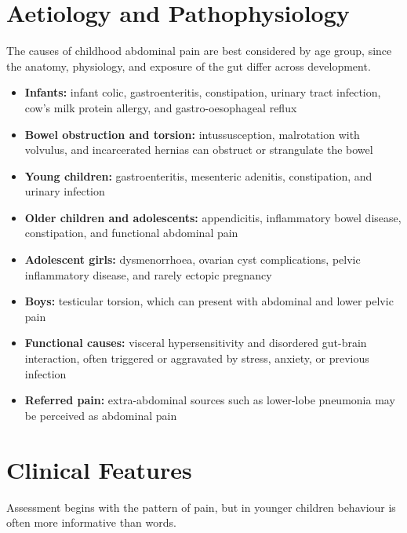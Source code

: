 \section*{Aetiology and Pathophysiology}
The causes of childhood abdominal pain are best considered by age group, since the anatomy, physiology, and exposure of the gut differ across development.

\begin{itemize}
    \item \textbf{Infants:} infant colic, gastroenteritis, constipation, urinary tract infection, cow's milk protein allergy, and gastro-oesophageal reflux
    \item \textbf{Bowel obstruction and torsion:} intussusception, malrotation with volvulus, and incarcerated hernias can obstruct or strangulate the bowel
    \item \textbf{Young children:} gastroenteritis, mesenteric adenitis, constipation, and urinary infection
    \item \textbf{Older children and adolescents:} appendicitis, inflammatory bowel disease, constipation, and functional abdominal pain
    \item \textbf{Adolescent girls:} dysmenorrhoea, ovarian cyst complications, pelvic inflammatory disease, and rarely ectopic pregnancy
    \item \textbf{Boys:} testicular torsion, which can present with abdominal and lower pelvic pain
    \item \textbf{Functional causes:} visceral hypersensitivity and disordered gut-brain interaction, often triggered or aggravated by stress, anxiety, or previous infection
    \item \textbf{Referred pain:} extra-abdominal sources such as lower-lobe pneumonia may be perceived as abdominal pain
\end{itemize}

\section*{Clinical Features}
Assessment begins with the pattern of pain, but in younger children behaviour is often more informative than words.

